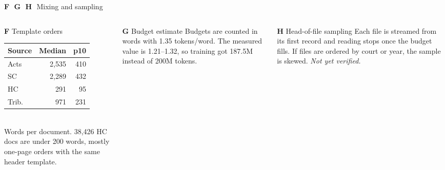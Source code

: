 \documentclass[aspectratio=169,11pt]{beamer}
\newcommand{\pb}[1]{\textbf{\textcolor{warm}{#1}}}   %
\begin{document}
\begin{frame}{\pb{F}\,\, \pb{G}\,\, \pb{H}\,\, Mixing and sampling}
  \begin{columns}[T]
    \begin{column}{0.36\textwidth}
      \footnotesize
      \begin{block}{\pb{F} Template orders}
        \begin{tabular}{lrr}
          \toprule
          Source & Median & p10 \\
          \midrule
          Acts   & 2{,}535 & 410 \\
          SC     & 2{,}289 & 432 \\
          HC     & \textcolor{warm}{291} & \textcolor{warm}{95} \\
          Trib.  & 971 & 231 \\
          \bottomrule
        \end{tabular}\\[1mm]
        Words per document. 38{,}426 HC docs are under 200 words, mostly one-page orders with the same header template.
      \end{block}
    \end{column}
    \begin{column}{0.30\textwidth}
      \footnotesize
      \begin{block}{\pb{G} Budget estimate}
        Budgets are counted in words with 1.35 tokens/word. The measured value is 1.21--1.32, so training got 187.5M instead of 200M tokens.
      \end{block}
    \end{column}
    \begin{column}{0.30\textwidth}
      \footnotesize
      \begin{block}{\pb{H} Head-of-file sampling}
        Each file is streamed from its first record and reading stops once the budget fills. If files are ordered by court or year, the sample is skewed. \emph{Not yet verified.}
      \end{block}
    \end{column}
  \end{columns}
\end{frame}
\end{document}
